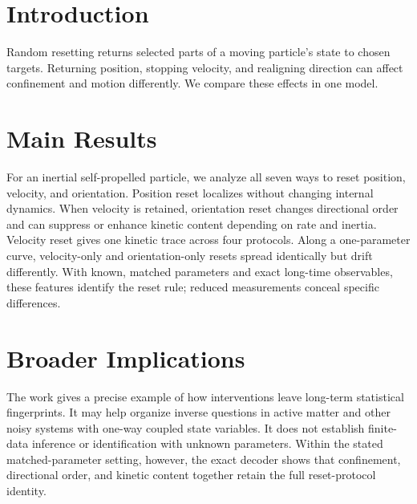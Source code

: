 \documentclass[11pt]{article}
\begin{document}
\section*{Introduction}
Random resetting returns selected parts of a moving particle's state to chosen targets. Returning position, stopping velocity, and realigning direction can affect confinement and motion differently. We compare these effects in one model.

\section*{Main Results}
For an inertial self-propelled particle, we analyze all seven ways to reset position, velocity, and orientation. Position reset localizes without changing internal dynamics. When velocity is retained, orientation reset changes directional order and can suppress or enhance kinetic content depending on rate and inertia. Velocity reset gives one kinetic trace across four protocols. Along a one-parameter curve, velocity-only and orientation-only resets spread identically but drift differently. With known, matched parameters and exact long-time observables, these features identify the reset rule; reduced measurements conceal specific differences.

\section*{Broader Implications}
The work gives a precise example of how interventions leave long-term statistical fingerprints. It may help organize inverse questions in active matter and other noisy systems with one-way coupled state variables. It does not establish finite-data inference or identification with unknown parameters. Within the stated matched-parameter setting, however, the exact decoder shows that confinement, directional order, and kinetic content together retain the full reset-protocol identity.
\end{document}
